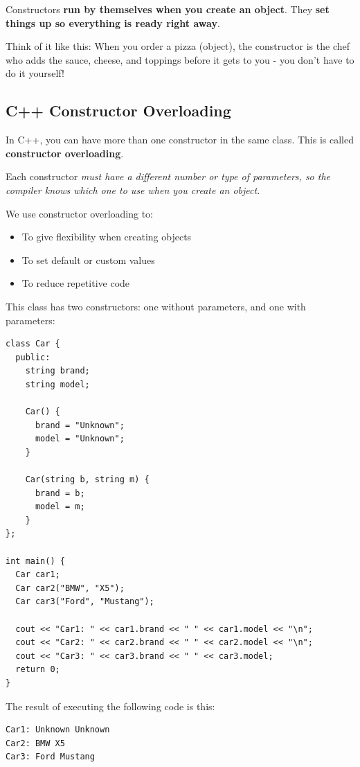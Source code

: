 \documentclass[../basic_programs.tex]{subfiles}
\begin{document}
    Constructors \textbf{run by themselves when you create an object}. They \textbf{set things up so everything is ready right away}.

    Think of it like this: When you order a pizza (object), the constructor is the chef who adds the sauce, cheese, and toppings before it gets to you - you don't have to do it yourself!

    \subsection{C++ Constructor Overloading}

    In C++, you can have more than one constructor in the same class. This is called \textbf{constructor overloading}.

    \begin{obs}
        Each constructor \textit{must have a different number or type of parameters, so the compiler knows which one to use when you create an object}.
    \end{obs}

    \begin{idea}
        We use constructor overloading to:
        \begin{itemize}
            \item To give flexibility when creating objects
            \item To set default or custom values
            \item To reduce repetitive code
        \end{itemize}
    \end{idea}

    \begin{exa}
        This class has two constructors: one without parameters, and one with parameters:
        \begin{lstlisting}[caption={caption},label=DescriptiveLabel]
class Car {
  public:
    string brand;
    string model;

    Car() {
      brand = "Unknown";
      model = "Unknown";
    }

    Car(string b, string m) {
      brand = b;
      model = m;
    }
};

int main() {
  Car car1;
  Car car2("BMW", "X5");
  Car car3("Ford", "Mustang");

  cout << "Car1: " << car1.brand << " " << car1.model << "\n";
  cout << "Car2: " << car2.brand << " " << car2.model << "\n";
  cout << "Car3: " << car3.brand << " " << car3.model;
  return 0;
}
        \end{lstlisting}

        The result of executing the following code is this:
        \begin{lstlisting}[caption={caption},label=DescriptiveLabel]
Car1: Unknown Unknown
Car2: BMW X5
Car3: Ford Mustang
        \end{lstlisting}
    \end{exa}
\end{document}
